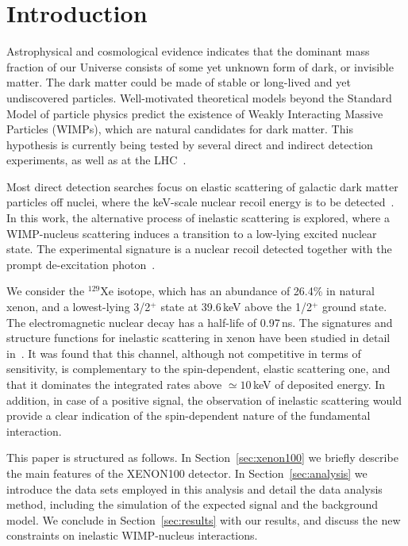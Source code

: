 \section{\label{sec:intro} Introduction}

Astrophysical and cosmological evidence indicates that the dominant mass fraction of our Universe consists of some yet unknown
form of dark, or invisible matter. The dark matter could be made of stable or long-lived and yet undiscovered particles. Well-motivated
theoretical models beyond the Standard Model of particle physics predict the existence of Weakly Interacting Massive
Particles (WIMPs), which are natural candidates for dark matter. This hypothesis is currently being tested by several direct
and indirect detection experiments, as well as at the LHC~\cite{Bertone:2010zza,Baudis:2016qwx}.

Most direct detection searches focus on elastic scattering of galactic dark matter particles off nuclei, where the keV-scale 
nuclear recoil energy is to be detected~\cite{Undagoitia:2015gya,Baudis:2015mpa}. In this work, the 
alternative process of inelastic scattering is explored, where a WIMP-nucleus scattering induces a transition to a low-lying 
excited nuclear state. The experimental signature is a nuclear recoil detected together with the prompt de-excitation 
photon~\cite{Ellis:1988nb}. 

We consider the $^{129}\text{Xe}$ isotope, which has an abundance of 26.4\% in natural xenon, and a lowest-lying 
3/2$^{+}$ state at 39.6\,keV above the 1/2$^+$ ground state. The electromagnetic nuclear decay has a half-life of 0.97\,ns. 
The signatures and structure functions for inelastic scattering in xenon have been studied in detail in~\cite{Baudis:2013bba}. 
It was found that this channel, 
{\ale although not competitive in terms of sensitivity,}  
is complementary to the spin-dependent, elastic scattering one, 
and that it dominates the integrated rates above $\simeq10$\,keV of deposited energy. 
In addition, in case of a positive signal, the observation of inelastic scattering would provide a clear 
indication of the spin-dependent nature of the fundamental interaction. 

This paper is structured as follows.  In Section~\ref{sec:xenon100} we briefly describe the main features of the XENON100 detector.  In Section~\ref{sec:analysis} we introduce the data 
sets employed in this analysis and detail the data analysis method, including the simulation of the expected signal and the 
background model. We conclude in Section~\ref{sec:results} with our results, and discuss the new constraints on inelastic WIMP-nucleus interactions.

